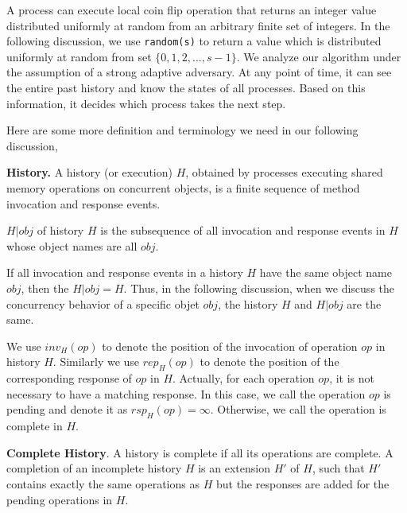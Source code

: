 A process can execute local coin flip operation that returns an integer value distributed uniformly at random from an arbitrary finite set of integers. In the following discussion, we use \texttt{random(s)} to return a value which is distributed uniformly at random from set $\{0, 1, 2,..., s-1\}$. We analyze our algorithm under the assumption of a strong adaptive adversary. At any point of time, it can see the entire past history and know the states of all processes. Based on this information, it decides which process takes the next step.

Here are some more definition and terminology we need in our following discussion,
\theoremstyle{definition}

\begin{definition}{\textbf{History.}}
A history  (or execution) $H$, obtained by processes executing shared memory operations on concurrent objects, is a finite sequence of method invocation and response events.
\end{definition}


\begin{definition}
$H|obj$ of history $H$ is the subsequence of all invocation and response events in $H$ whose object names are all $obj$.
\end{definition}

If all invocation and response events in a history $H$ have the same object name $obj$, then the $H|obj = H$. Thus, in the following discussion, when we discuss the concurrency behavior of a specific objet $obj$, the history $H$ and $H|obj$ are the same.

We use $inv_H(op)$ to denote the position of the invocation of operation $op$ in history $H$. Similarly we use $rep_H(op)$ to denote the position of the corresponding response of $op$ in $H$. Actually, for each operation $op$, it is not necessary to have a matching response. In this case, we call the operation $op$ is pending and denote it as $rsp_H(op) = \infty$. Otherwise, we call the operation is complete in $H$.

\begin{definition}{\textbf{Complete History}.}
A history is complete if all its operations are complete. A completion of an incomplete history $H$ is an extension $H'$ of $H$, such that $H'$ contains exactly the same operations as $H$ but the responses are added for the pending operations in $H$.
\end{definition}


